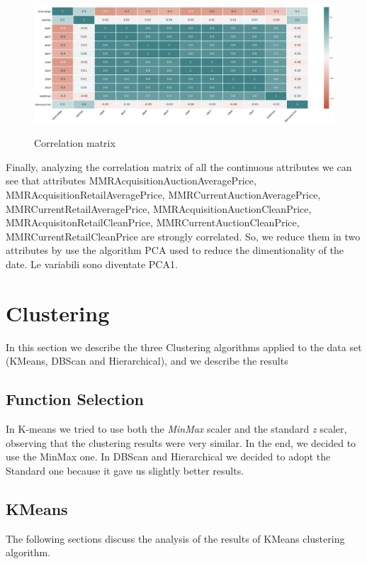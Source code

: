 \documentclass{article}
\begin{document}
\begin{figure}[H]
	\centering
	{\includegraphics[width=1.1\textwidth, height=1.1\textheight, keepaspectratio]{corr.png}}
	\caption{{ Correlation matrix }}
\end{figure}


Finally, analyzing the correlation matrix of all the continuous attributes we can see that attributes MMRAcquisitionAuctionAveragePrice, MMRAcquisitionRetailAveragePrice, MMRCurrentAuctionAveragePrice, MMRCurrentRetailAveragePrice, MMRAcquisitionAuctionCleanPrice, MMRAcquisitonRetailCleanPrice, MMRCurrentAuctionCleanPrice, MMRCurrentRetailCleanPrice are strongly correlated. So, we reduce them in two attributes by use the algorithm PCA used to reduce the dimentionality of the date.
Le variabili sono diventate PCA1.

\section{Clustering}
In this section we describe the three Clustering algorithms applied to the data set (KMeans, DBScan and Hierarchical), and we describe the results

\subsection{Function Selection}
In K-means we tried to use both the \emph{MinMax} scaler and the standard \emph{z} scaler, observing that the clustering results were very similar. In the end, we decided to use the MinMax one.
In DBScan and Hierarchical we decided to adopt the Standard one because it gave us slightly better results.

\subsection{KMeans}
The following sections discuss the analysis of the results of KMeans clustering algorithm.
\end{document}
